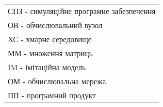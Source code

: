 
\begin{tabular}{l}
	\\
	СПЗ - симуляційне програмне забезпечення
	\\
	ОВ  - обчислювальний вузол
	\\
	ХС  - хмарне середовище
	\\
	ММ  - множення матриць
	\\
	IM  - імітаційна модель
	\\
	ОМ  - обчислювальна мережа
	\\
	ПП  - програмний продукт
\end{tabular}